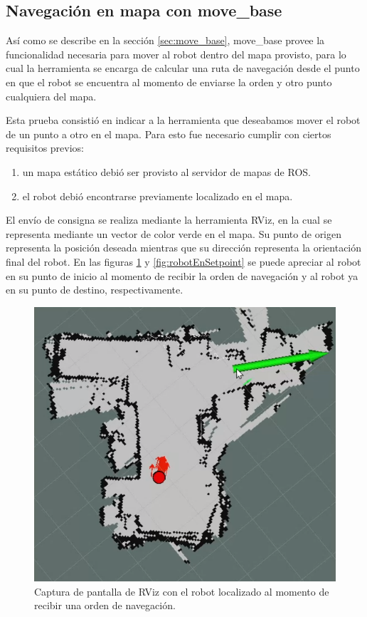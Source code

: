\subsection{Navegación en mapa con move\_base}

Así como se describe en la sección \ref{sec:move_base}, move\_base provee la funcionalidad necesaria para mover al robot dentro del mapa provisto, para lo cual la herramienta se encarga de calcular una ruta de navegación desde el punto en que el robot se encuentra al momento de enviarse la orden y otro punto cualquiera del mapa.

Esta prueba consistió en indicar a la herramienta que deseabamos mover el robot de un punto a otro en el mapa. Para esto fue necesario cumplir con ciertos requisitos previos:

\begin{enumerate}
    \item un mapa estático debió ser provisto al servidor de mapas de ROS.
    \item el robot debió encontrarse previamente localizado en el mapa.
\end{enumerate}

El envío de consigna se realiza mediante la herramienta RViz, en la cual se representa mediante un vector de color verde en el mapa. Su punto de origen representa la posición deseada mientras que su dirección representa la orientación final del robot. En las figuras \ref{fig:comandoNavegación} y \ref{fig:robotEnSetpoint} se puede apreciar al robot en su punto de inicio al momento de recibir la orden de navegación y al robot ya en su punto de destino, respectivamente.


\begin{figure}[ht]
    \centering
    \includegraphics[scale=0.35]{./Figures/comando_navegacion.png}
    \caption{Captura de pantalla de RViz con el robot localizado al momento de recibir una orden de navegación.}
    \label{fig:comandoNavegación}
\end{figure}


